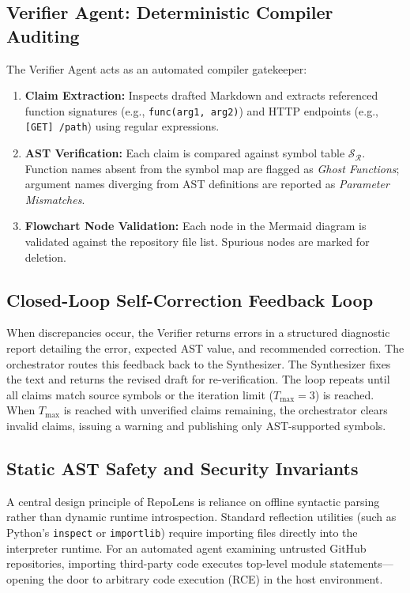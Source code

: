 \documentclass[conference]{IEEEtran}
\begin{document}
\subsection{Verifier Agent: Deterministic Compiler Auditing}
The Verifier Agent acts as an automated compiler gatekeeper:
\begin{enumerate}
    \item \textbf{Claim Extraction:} Inspects drafted Markdown and extracts referenced function signatures (e.g., \texttt{func(arg1, arg2)}) and HTTP endpoints (e.g., \texttt{[GET] /path}) using regular expressions.
    \item \textbf{AST Verification:} Each claim is compared against symbol table $\mathcal{S}_{\mathcal{R}}$. Function names absent from the symbol map are flagged as \textit{Ghost Functions}; argument names diverging from AST definitions are reported as \textit{Parameter Mismatches}.
    \item \textbf{Flowchart Node Validation:} Each node in the Mermaid diagram is validated against the repository file list. Spurious nodes are marked for deletion.
\end{enumerate}

\subsection{Closed-Loop Self-Correction Feedback Loop}
When discrepancies occur, the Verifier returns errors in a structured diagnostic report detailing the error, expected AST value, and recommended correction. The orchestrator routes this feedback back to the Synthesizer. The Synthesizer fixes the text and returns the revised draft for re-verification. The loop repeats until all claims match source symbols or the iteration limit ($T_{\max} = 3$) is reached. When $T_{\max}$ is reached with unverified claims remaining, the orchestrator clears invalid claims, issuing a warning and publishing only AST-supported symbols.

\subsection{Static AST Safety and Security Invariants}
A central design principle of RepoLens is reliance on offline syntactic parsing rather than dynamic runtime introspection. Standard reflection utilities (such as Python's \texttt{inspect} or \texttt{importlib}) require importing files directly into the interpreter runtime. For an automated agent examining untrusted GitHub repositories, importing third-party code executes top-level module statements—opening the door to arbitrary code execution (RCE) in the host environment.
\end{document}
